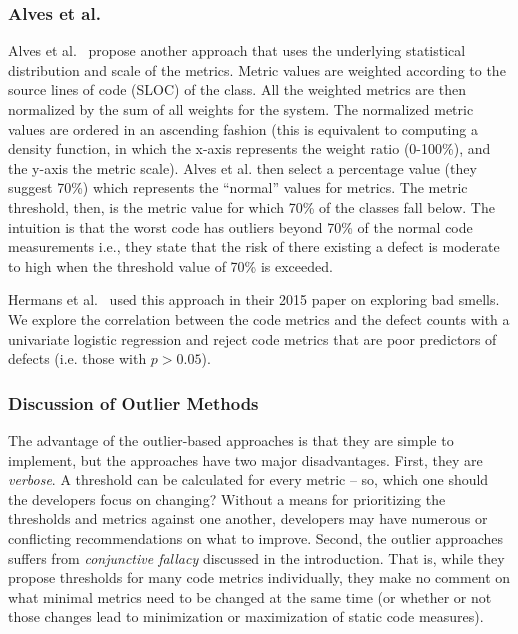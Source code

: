 \documentclass[twocolumn,5p]{elsarticle}
\theoremstyle{break}
\begin{document}
	
	\subsubsection{ Alves et al.}
	Alves et al.~\cite{Alves2010} propose another approach
	that  uses the underlying statistical 
	distribution and scale of the metrics.
	Metric values are weighted according to the source lines of 
	code (SLOC) of the class. All the weighted metrics are then normalized by 
	the sum of all weights for the system.
	The normalized metric values are ordered in an ascending fashion (this is 
	equivalent to computing a density function, in which the x-axis represents 
	the weight ratio (0-100\%), and the y-axis the metric scale).
	Alves et al. then select a percentage value (they suggest 70\%) which 
	represents the ``normal'' values for metrics. The metric threshold, then, 
	is the metric value for which 70\% of the classes fall below. The 
	intuition  is that the worst code has outliers beyond 70\% of the normal 
	code measurements i.e., they state that the risk of there existing a defect 
	is moderate to high when the threshold value of 70\% is exceeded.
	
	
	Hermans et al.~\cite{hermans15} used this approach in their  2015 paper on
	exploring bad smells. We explore the correlation between the code metrics 
	and the defect counts with a univariate logistic regression and  reject 
	code metrics that are poor predictors of defects (i.e.   those  with $p > 
	0.05$).
	
	\subsubsection{Discussion of Outlier Methods}\label{sect:disc}
	The advantage of the outlier-based
	approaches is that they are simple to implement, but the approaches have   
	two  major disadvantages.
	First, they are {\em verbose}. A threshold can be calculated for every 
	metric -- so, which one should the developers focus on changing? Without a 
	means for prioritizing the  thresholds and metrics against one another, 
	developers may have numerous or conflicting recommendations on what to 
	improve. Second, the outlier approaches suffers from {\em conjunctive 
	fallacy}  discussed in the introduction. That is, while	they propose 
	thresholds for many code metrics
	individually, they make no comment on what minimal metrics need to be 
	changed at the same time (or whether or not those changes lead to 
	minimization or maximization of static code measures).
	
\end{document}
